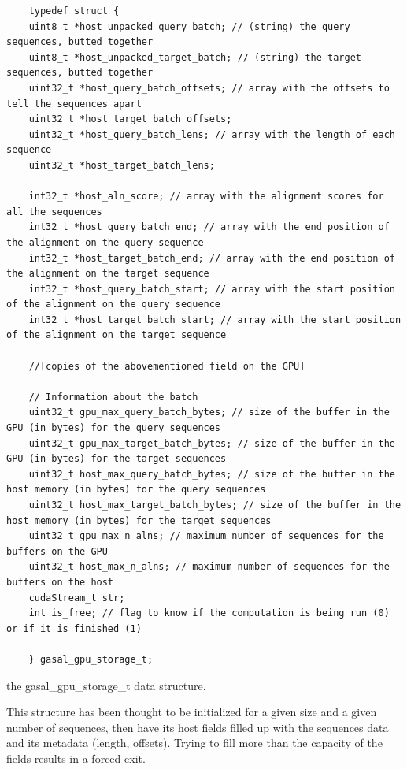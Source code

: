 \begin{listing}
	\begin{verbatim}
	typedef struct {	
	uint8_t *host_unpacked_query_batch; // (string) the query sequences, butted together
	uint8_t *host_unpacked_target_batch; // (string) the target sequences, butted together
	uint32_t *host_query_batch_offsets; // array with the offsets to tell the sequences apart
	uint32_t *host_target_batch_offsets;
	uint32_t *host_query_batch_lens; // array with the length of each sequence
	uint32_t *host_target_batch_lens;
	
	int32_t *host_aln_score; // array with the alignment scores for all the sequences
	int32_t *host_query_batch_end; // array with the end position of the alignment on the query sequence
	int32_t *host_target_batch_end; // array with the end position of the alignment on the target sequence
	int32_t *host_query_batch_start; // array with the start position of the alignment on the query sequence
	int32_t *host_target_batch_start; // array with the start position of the alignment on the target sequence
	
	//[copies of the abovementioned field on the GPU]
	
	// Information about the batch
	uint32_t gpu_max_query_batch_bytes; // size of the buffer in the GPU (in bytes) for the query sequences
	uint32_t gpu_max_target_batch_bytes; // size of the buffer in the GPU (in bytes) for the target sequences
	uint32_t host_max_query_batch_bytes; // size of the buffer in the host memory (in bytes) for the query sequences
	uint32_t host_max_target_batch_bytes; // size of the buffer in the host memory (in bytes) for the target sequences
	uint32_t gpu_max_n_alns; // maximum number of sequences for the buffers on the GPU
	uint32_t host_max_n_alns; // maximum number of sequences for the buffers on the host
	cudaStream_t str; 
	int is_free; // flag to know if the computation is being run (0) or if it is finished (1)
	
	} gasal_gpu_storage_t;
	\end{verbatim}
	\caption{the gasal\_gpu\_storage\_t data structure.}
	\label{lst:gpu_storage}
\end{listing}


This structure has been thought to be initialized for a given size and a given number of sequences, then have its host fields filled up with the sequences data and its metadata (length, offsets). Trying to fill more than the capacity of the fields results in a forced exit.


